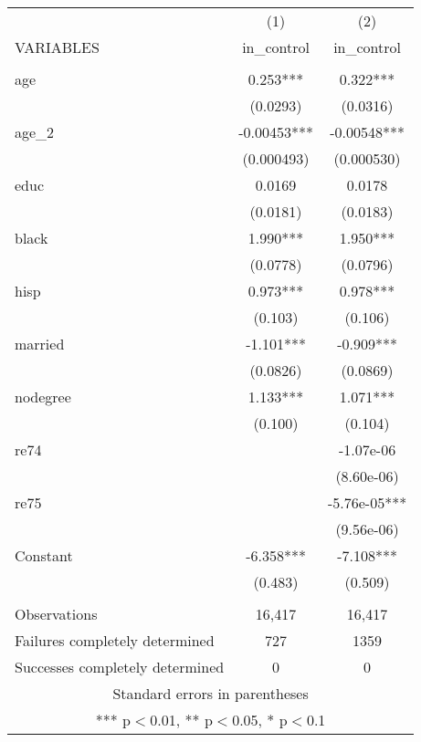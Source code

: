 \begin{tabular}{lcc} \hline
 & (1) & (2) \\
VARIABLES & in\_control & in\_control \\ \hline
 &  &  \\
age & 0.253*** & 0.322*** \\
 & (0.0293) & (0.0316) \\
age\_2 & -0.00453*** & -0.00548*** \\
 & (0.000493) & (0.000530) \\
educ & 0.0169 & 0.0178 \\
 & (0.0181) & (0.0183) \\
black & 1.990*** & 1.950*** \\
 & (0.0778) & (0.0796) \\
hisp & 0.973*** & 0.978*** \\
 & (0.103) & (0.106) \\
married & -1.101*** & -0.909*** \\
 & (0.0826) & (0.0869) \\
nodegree & 1.133*** & 1.071*** \\
 & (0.100) & (0.104) \\
re74 &  & -1.07e-06 \\
 &  & (8.60e-06) \\
re75 &  & -5.76e-05*** \\
 &  & (9.56e-06) \\
Constant & -6.358*** & -7.108*** \\
 & (0.483) & (0.509) \\
 &  &  \\
Observations & 16,417 & 16,417 \\
Failures completely determined & 727 & 1359 \\
 Successes completely determined & 0 & 0 \\ \hline
\multicolumn{3}{c}{ Standard errors in parentheses} \\
\multicolumn{3}{c}{ *** p$<$0.01, ** p$<$0.05, * p$<$0.1} \\
\end{tabular}
